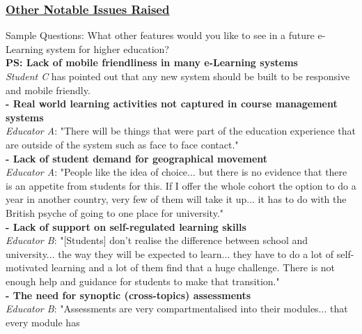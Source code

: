 \subsubsection{\underline{Other Notable Issues Raised}}

Sample Questions: What other features would you like to see in a future e-Learning system for 
higher education?
\vspace{0.25cm}\\
\textbf{PS: Lack of mobile friendliness in many e-Learning systems}\\
\textit{Student C} has pointed out that any new system should be built to be responsive and mobile friendly.
\vspace{0.25cm}\\
\textbf{- Real world learning activities not captured in course management systems}\\
\textit{Educator A}: "There will be things that were part of the education experience that are outside of the system
such as face to face contact."
\vspace{0.25cm}\\
\textbf{- Lack of student demand for geographical movement}\\
\textit{Educator A}: "People like the idea of choice... but there is no evidence that there is an appetite 
from students for this. If I offer the whole cohort the option to do a year in another country,
very few of them will take it up... it has to do with the British psyche of going to one place for 
university."
\vspace{0.25cm}\\
\textbf{- Lack of support on self-regulated learning skills}\\
\textit{Educator B}: "[Students] don't realise the difference between school and university... the way 
they will be expected to learn... they have to do a lot of self-motivated learning and a lot of them 
find that a huge challenge. There is not enough help and guidance for students to make that transition."
\vspace{0.25cm}\\
\textbf{- The need for synoptic (cross-topics) assessments}\\
\textit{Educator B}: "Assessments are very compartmentalised into their modules... that every module has 
